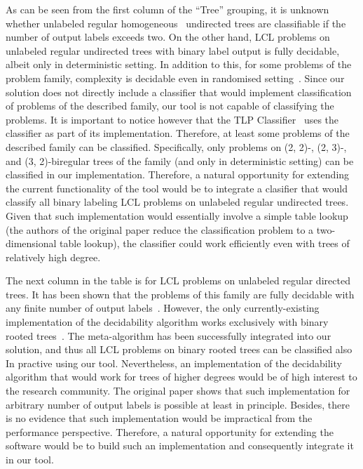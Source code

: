 As can be seen from the first column of the ``Tree'' grouping, it is unknown whether
unlabeled regular homogeneous~\cite{BalliuHomogeneous}
undirected trees are classifiable if the number of
output labels exceeds two. On the other hand, LCL problems on
unlabeled regular undirected trees with binary label output is fully decidable, albeit
only in deterministic setting. In addition to this, for some problems of the problem family,
complexity is decidable even in randomised setting~\cite{Balliu2019c}.
Since our solution does not directly include a classifier that would implement
classification of problems of the described family, our tool is not capable of
classifying the problems. It is important to notice however that the TLP
Classifier~\cite{Rocher2020clas} uses the classifier as part of its implementation.
Therefore, at least some problems of the described family can be classified. Specifically,
only problems on (2, 2)-, (2, 3)-, and (3, 2)-biregular trees of the family
(and only in deterministic setting) can be classified in our implementation.
Therefore, a natural opportunity for extending the current functionality of the tool
would be to integrate a clasifier that would classify all binary labeling LCL problems
on unlabeled regular undirected trees. Given that such implementation would
essentially involve a simple table lookup (the authors of the original paper
reduce the classification problem to a two-dimensional table lookup), the
classifier could work efficiently even with trees of relatively high degree.

The next column in the table is for LCL problems on unlabeled regular directed
trees. It has been shown that the problems of this family are fully decidable
with any finite number of output labels~\cite{Balliu2021}. However, the
only currently-existing implementation of the decidability algorithm
works exclusively with binary rooted trees~\cite{Studeny2021}. The
meta-algorithm has been successfully integrated into our solution, and
thus all LCL problems on binary rooted trees can be classified also In
practive using our tool. Nevertheless, an implementation of the
decidability algorithm that would work for trees of higher degrees
would be of high interest to the research community. The original
paper shows that such implementation for arbitrary number of output
labels is possible at least in principle. Besides, there is no
evidence that such implementation would be impractical from the
performance perspective. Therefore, a natural opportunity for
extending the software would be to build such an implementation and
consequently integrate it in our tool.

